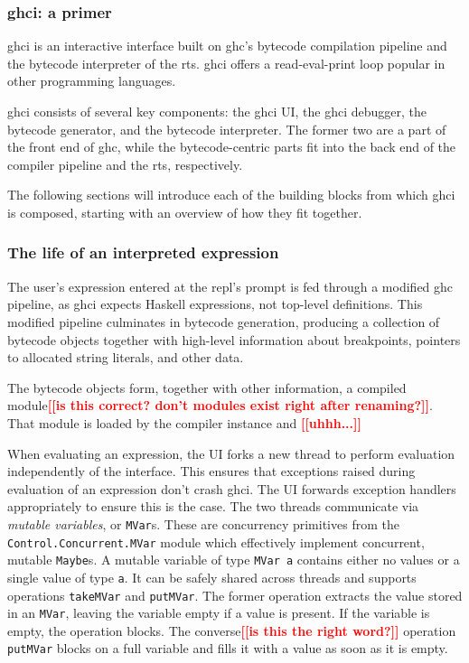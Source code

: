 \documentclass[thesis=B,english]{FITthesis}[2019/12/23]
\newcommand{\todo}[1]{\textcolor{red}{\textbf{[[#1]]}}}
\newcommand{\hsType}[1]{\texttt{#1}}
\newcommand{\hsIdent}[1]{\texttt{#1}}
\newcommand{\hsModule}[1]{\texttt{#1}}
\begin{document}
\subsubsection{\acrshort{ghci}: a primer}
\acrshort{ghci} is an interactive interface built on \acrshort{ghc}'s bytecode
compilation pipeline and the bytecode interpreter of the \acrshort{rts}.
\acrshort{ghci} offers a read-eval-print loop popular in other programming
languages.

\acrshort{ghci} consists of several key components: the \acrshort{ghci} UI, the
\acrshort{ghci} debugger, the bytecode generator, and the bytecode interpreter.
The former two are a part of the front end of \acrshort{ghc}, while the
bytecode-centric parts fit into the back end of the compiler pipeline and the
\acrshort{rts}, respectively.

The following sections will introduce each of the building blocks from which
\acrshort{ghci} is composed, starting with an overview of how they fit
together.

\subsubsection{The life of an interpreted expression}
The user's expression entered at the \acrshort{repl}'s prompt is fed through a
modified \acrshort{ghc} pipeline, as \acrshort{ghci} expects Haskell
expressions, not top-level definitions. This modified pipeline culminates in
bytecode generation, producing a collection of bytecode objects together with
high-level information about breakpoints, pointers to allocated string
literals, and other data.

The bytecode objects form, together with other information, a compiled
module\todo{is this correct? don't modules exist right after renaming?}.
That module is loaded by the compiler instance and \todo{uhhh...}

When evaluating an expression, the UI forks a new thread to perform evaluation
independently of the interface. This ensures that exceptions raised during
evaluation of an expression don't crash \acrshort{ghci}. The UI forwards
exception handlers appropriately to ensure this is the case. The two threads
communicate via \textit{mutable variables}, or \hsType{MVar}s. These are
concurrency primitives from the \hsModule{Control.Concurrent.MVar} module which
effectively implement concurrent, mutable
\hsType{Maybe}s\cite{concurrent-haskell}. A mutable variable of type
\hsType{MVar a} contains either no values or a single value of type \hsType{a}.
It can be safely shared across threads and supports operations
\hsIdent{takeMVar} and \hsIdent{putMVar}. The former operation extracts the
value stored in an \hsType{MVar}, leaving the variable empty if a value is
present. If the variable is empty, the operation blocks. The converse\todo{is
this the right word?} operation \hsIdent{putMVar} blocks on a full variable and
fills it with a value as soon as it is empty.
\end{document}
